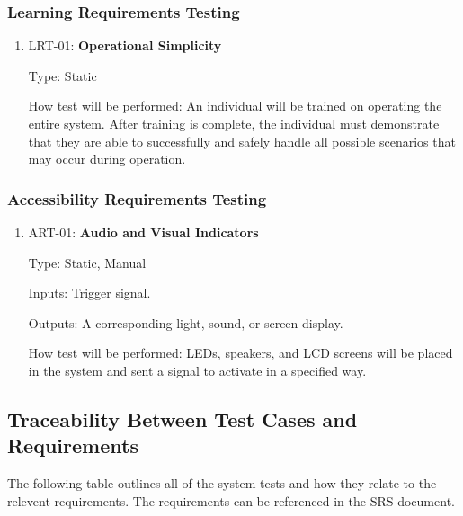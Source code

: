\documentclass[12pt, titlepage]{article}
\begin{document}
\subsubsection{Learning Requirements Testing}
\begin{enumerate}
  \item{LRT-01: \textbf{Operational Simplicity}}
  
Type: Static				
					
How test will be performed: An individual will be trained on operating the entire system.
After training is complete, the individual must demonstrate that they are able to 
successfully and safely handle all possible scenarios that may occur during operation.
\end{enumerate}

\subsubsection{Accessibility Requirements Testing}
\begin{enumerate}
  \item{ART-01: \textbf{Audio and Visual Indicators}}
  
Type: Static, Manual

Inputs: Trigger signal.

Outputs: A corresponding light, sound, or screen display.

How test will be performed: LEDs, speakers, and LCD screens will be placed in the
system and sent a signal to activate in a specified way.
\end{enumerate}


\subsection{Traceability Between Test Cases and Requirements}
The following table outlines all of the system tests and how they relate to the
relevent requirements. The requirements can be referenced in the SRS document.\\
\end{document}
